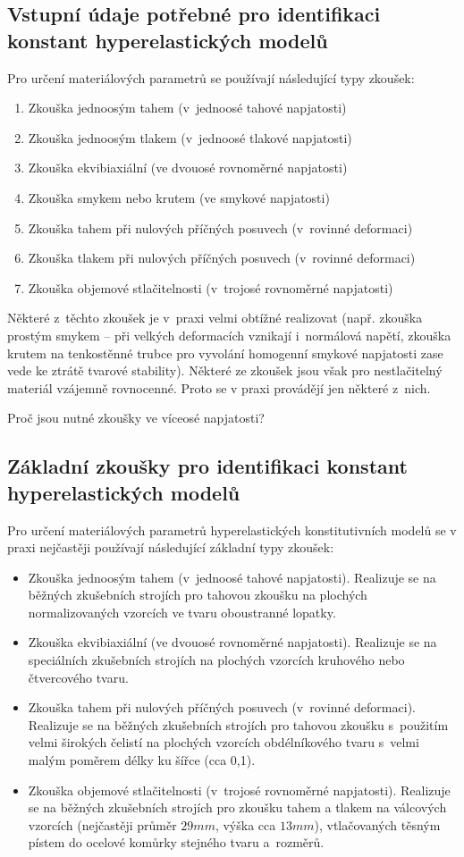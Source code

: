 \subsection{Vstupní údaje potřebné pro identifikaci konstant hyperelastických modelů}
Pro určení materiálových parametrů se používají následující typy zkoušek:
\begin{enumerate}
	\item Zkouška jednoosým tahem (v~jednoosé tahové napjatosti)
	\item Zkouška jednoosým tlakem (v~jednoosé tlakové napjatosti)
	\item Zkouška ekvibiaxiální (ve dvouosé rovnoměrné napjatosti)
	\item Zkouška smykem nebo krutem (ve smykové napjatosti)
	\item Zkouška tahem při nulových příčných posuvech (v~rovinné deformaci)
	\item Zkouška tlakem při nulových příčných posuvech (v~rovinné deformaci)
	\item Zkouška objemové stlačitelnosti (v~trojosé rovnoměrné napjatosti)
\end{enumerate}
Některé z~těchto zkoušek je v~praxi velmi obtížné realizovat (např. zkouška prostým smykem -- při velkých deformacích vznikají i~normálová napětí, zkouška krutem na tenkostěnné trubce pro vyvolání homogenní smykové napjatosti zase vede ke ztrátě tvarové stability).
Některé ze zkoušek jsou však pro nestlačitelný materiál vzájemně rovnocenné. Proto se v praxi provádějí jen některé z~nich.

Proč jsou nutné zkoušky ve víceosé napjatosti?

\subsection{Základní zkoušky pro identifikaci konstant hyperelastických modelů}
Pro určení materiálových parametrů hyperelastických konstitutivních modelů se v praxi nejčastěji používají následující základní typy zkoušek:
\begin{itemize}
	\item Zkouška jednoosým tahem (v~jednoosé tahové napjatosti). Realizuje se na běžných zkušebních strojích pro tahovou zkoušku na plochých normalizovaných vzorcích ve tvaru oboustranné lopatky.
	\item Zkouška ekvibiaxiální (ve dvouosé rovnoměrné napjatosti). Realizuje se na speciálních zkušebních strojích na plochých vzorcích kruhového nebo čtvercového tvaru.
	\item Zkouška tahem při nulových příčných posuvech (v~rovinné deformaci). Realizuje se na běžných zkušebních strojích pro tahovou zkoušku s~použitím velmi širokých čelistí na plochých vzorcích obdélníkového tvaru s~velmi malým poměrem délky ku šířce (cca 0,1).
	\item Zkouška objemové stlačitelnosti (v~trojosé rovnoměrné napjatosti). Realizuje se na běžných zkušebních strojích pro zkoušku tahem a tlakem na válcových vzorcích  (nejčastěji průměr $29mm$, výška cca $13mm$), vtlačovaných těsným pístem do ocelové komůrky stejného tvaru a~rozměrů.
\end{itemize}

